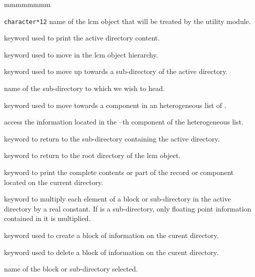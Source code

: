 \begin{ListeDeDescription}{mmmmmmmm}

\item[\dusa{NAME1}] {\tt character*12} name of the {\sc lcm} object
that will be treated by the utility module.

\item[\moc{DIR}] keyword used to print the active directory content.

\item[\moc{STEP}] keyword used to move in the {\sc lcm} object hierarchy.

\item[\moc{UP}] keyword used to move up towards a sub-directory of the
active directory.

\item[\dusa{NOMDIR}] name of the sub-directory to which we wish to head.

\item[\moc{AT}] keyword used to move towards a component in an heterogeneous list of .

\item[\dusa{index}] access the information located in the --th component of the heterogeneous list.

\item[\moc{DOWN}] keyword to return to the sub-directory containing
the active directory.

\item[\moc{ROOT}] keyword to return to the root directory of the {\sc lcm} object.

\item[\moc{IMPR}] keyword to print the complete contents or part of the record
 or component  located on the current directory.

\item[\moc{MULT}] keyword to multiply each element of a block or sub-directory
in the active directory by a real constant. If  is a
sub-directory, only floating point information contained in it is multiplied.

\item[\moc{CREA}] keyword used to create a block of information on the
curent directory.

\item[\moc{DEL}] keyword used to delete a block of information on the
curent directory.

\item[\dusa{BLOCK}] name of the block or sub-directory selected.


\end{ListeDeDescription}
